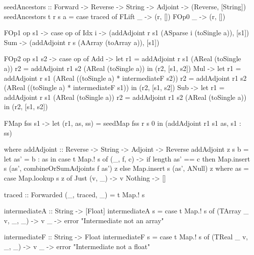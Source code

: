         \begin{haskell}[caption=Function for seeding ancestors of a node, label=lst:seedanc, gobble=12]
            seedAncestors :: Forward -> Reverse -> String -> Adjoint -> (Reverse, [String])
            seedAncestors t r s a = case traced of
                FLift _        -> (r, [])
                FOp0  _        -> (r, [])

                FOp1  op s1    -> case op of
                    Idx i -> (addAdjoint r s1 (ASparse i (toSingle a)), [s1])
                    Sum   -> (addAdjoint r s (AArray (toArray a)), [s1])
                
                FOp2  op s1 s2 -> case op of
                    Add -> 
                        let r1 = addAdjoint r  s1 (AReal (toSingle a))
                            r2 = addAdjoint r1 s2 (AReal (toSingle a))
                        in  (r2, [s1, s2])
                    Mul ->
                        let r1 = addAdjoint r  s1 (AReal ((toSingle a) * intermediateF s2))
                            r2 = addAdjoint r1 s2 (AReal ((toSingle a) * intermediateF s1))
                        in  (r2, [s1, s2])
                    Sub ->
                        let r1 = addAdjoint r  s1 (AReal (toSingle a))
                            r2 = addAdjoint r1 s2 (AReal (toSingle a))
                        in  (r2, [s1, s2])
                
                FMap  fss s1   ->
                    let (r1, as, ss) = seedMap fss r s 0
                    in  (addAdjoint r1 s1 as, s1 : ss)
                
                where    
                    addAdjoint :: Reverse -> String -> Adjoint -> Reverse
                    addAdjoint z s b =
                        let as' = b : as
                        in  case t Map.! s of
                            (_, f, c) ->
                                if   length as' == c
                                then Map.insert s (as', combineOrSumAdjoints f as') z
                                else Map.insert s (as', ANull) z
                        where
                            as = case Map.lookup s z of
                                Just (v, _) -> v
                                Nothing     -> []

                    traced :: Forwarded
                    (_, traced, _) = t Map.! s

                    intermediateA :: String -> [Float]
                    intermediateA s = case t Map.! s of
                        (TArray _ v, _, _) -> v
                        _                  -> error "Intermediate not an array"

                    intermediateF :: String -> Float
                    intermediateF s = case t Map.! s of
                        (TReal _ v, _, _) -> v
                        _                 -> error "Intermediate not a float"
        \end{haskell}

